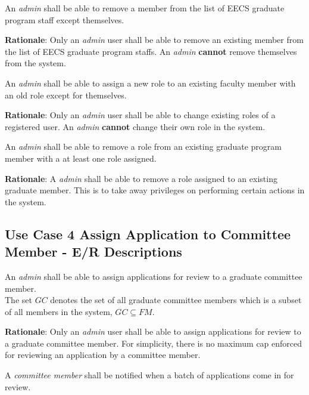 \documentclass[fontsize=12pt,paper=letter,twoside]{scrartcl}
\begin{document}
\genreq
{An \emph{admin} shall be able to remove a member from the list of EECS graduate program staff except themselves.\\}
{}
\label{R9}

\smallskip
\noindent \textbf{Rationale}: Only an \emph{admin} user shall be able to remove an existing member from the list of EECS graduate program staffs. An \emph{admin} \textbf{cannot} remove themselves from the system.

\genreq
{An \emph{admin} shall be able to assign a new role to an existing faculty member with an old role except for themselves.\\}
{}
\label{R10}

\smallskip
\noindent \textbf{Rationale}: Only an \emph{admin} user shall be able to change existing roles of a registered user. An \emph{admin} \textbf{cannot} change their own role in the system.

\genreq
{An \emph{admin} shall be able to remove a role from an existing graduate program member with a at least one role assigned.\\}
{}
\label{R11}

\smallskip
\noindent \textbf{Rationale}: A \emph{admin} shall be able to remove a role assigned to an existing graduate member. This is to take away privileges on performing certain actions in the system. 

\subsection{Use Case 4 Assign Application to Committee Member - E/R Descriptions}

\rdescription
{An \emph{admin} shall be able to assign applications for review to a graduate committee member.\\}
{The set $GC$ denotes the set of all graduate committee members which is a subset of all members in the system, $GC \subseteq FM$.}
\label{R12}

\smallskip
\noindent \textbf{Rationale}: Only an \emph{admin} user shall be able to assign applications for review to a graduate committee member. For simplicity, there is no maximum cap enforced for reviewing an application by a committee member.

\genreq
{A \emph{committee member} shall be notified when a batch of applications come in for review.\\}
{}
\label{R13}
\end{document}
